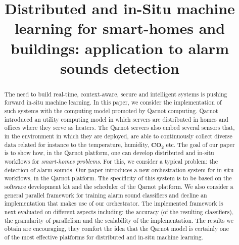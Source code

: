 \documentclass[10pt, conference, compsocconf]{IEEEtran}
\begin{document}
%
\title{Distributed and in-Situ machine learning for smart-homes and buildings: application to alarm sounds detection}



\author{
\and
{}
\and
{}
}

\maketitle

\setlength{\abovecaptionskip}{0pt}
\setlength{\belowcaptionskip}{0pt}
\setlength{\intextsep}{1pt}
\setlength{\dbltextfloatsep}{3pt}
\setlength{\textfloatsep}{3pt}


\begin{abstract}
The need to build real-time, context-aware, secure and intelligent systems is pushing forward in-situ machine learning. 
In this paper, we consider the implementation of such systems with the computing model promoted by 
Qarnot computing. Qarnot introduced an utility computing model in which servers are distributed in homes and offices where they
serve as heaters. The Qarnot servers also embed several sensors that, in the environment in which they are deployed, are able to continuously 
collect diverse data related for instance to the temperature, humidity, $\mathbf{CO_2}$ etc. The goal of our paper is to show how, 
in the Qarnot platform, one can develop distributed and in-situ workflows for {\it smart-homes problems}. For this, 
we consider a typical problem: the detection of alarm sounds. Our paper introduces a new orchestration system for in-situ workflows, 
in the Qarnot platform. 
The specificity of this system is to be based on the software development kit and the scheduler of the Qarnot platform.
We also consider a general parallel framework for training alarm sound classifiers and decline an implementation that makes 
use of our orchestrator.
The implemented framework is next evaluated on different aspects including: the accuracy (of the resulting classifiers), the granularity of parallelism and the scalability of the implementation. The results we obtain are encouraging, they comfort the idea that the Qarnot model is certainly one of the most effective platforms for distributed and in-situ machine learning. 
\end{abstract}
\end{document}
